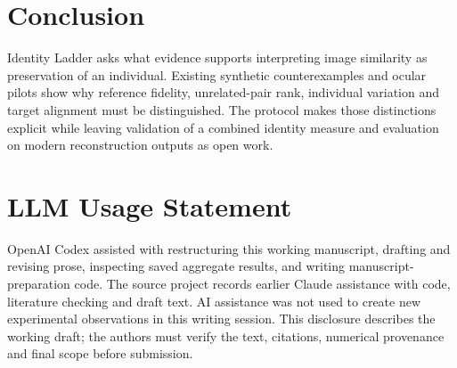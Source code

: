 \documentclass[10pt,twocolumn,letterpaper]{article}
\begin{document}
\section{Conclusion}
Identity Ladder asks what evidence supports interpreting image similarity as preservation of an individual. Existing synthetic counterexamples and ocular pilots show why reference fidelity, unrelated-pair rank, individual variation and target alignment must be distinguished. The protocol makes those distinctions explicit while leaving validation of a combined identity measure and evaluation on modern reconstruction outputs as open work.

\clearpage
\section*{LLM Usage Statement}
OpenAI Codex assisted with restructuring this working manuscript, drafting and revising prose, inspecting saved aggregate results, and writing manuscript-preparation code. The source project records earlier Claude assistance with code, literature checking and draft text. AI assistance was not used to create new experimental observations in this writing session. This disclosure describes the working draft; the authors must verify the text, citations, numerical provenance and final scope before submission.

{\small


}
\end{document}
